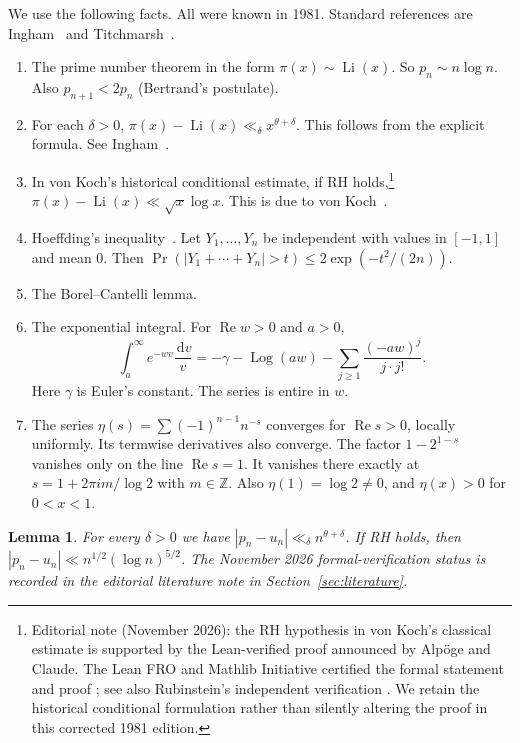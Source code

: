\documentclass[12pt,letterpaper]{article}
\newtheorem{lemma}[theorem]{Lemma}
\theoremstyle{definition}
\theoremstyle{remark}
\numberwithin{equation}{section}
\newcommand{\Li}{\operatorname{Li}}
\newcommand{\Log}{\operatorname{Log}}
\newcommand{\Ree}{\operatorname{Re}}
\newcommand{\dd}{\,\mathrm{d}}
\begin{document}
We use the following facts. All were known in 1981. Standard references
are Ingham~\cite{In32} and Titchmarsh~\cite{Ti51}.
\begin{enumerate}[label=(C\arabic*),leftmargin=3em]
\item\label{C:pnt} The prime number theorem in the form
  $\pi(x)\sim\Li(x)$. So $p_n\sim n\log n$. Also $p_{n+1}<2p_n$
  (Bertrand's postulate).
\item\label{C:ingham} For each $\delta>0$,
  $\pi(x)-\Li(x)\ll_\delta x^{\theta+\delta}$. This follows from the
  explicit formula. See Ingham~\cite{In32}.
\item\label{C:koch} In von Koch's historical conditional estimate, if RH holds,\footnote{Editorial note (November 2026): the RH hypothesis in
von Koch's classical estimate is supported by the Lean-verified proof
announced by Alp\"oge and Claude. The Lean FRO and Mathlib Initiative
certified the formal statement and proof \cite{LF26}; see also
Rubinstein's independent verification \cite{Ru26}. We retain the
historical conditional formulation rather than silently altering
the proof in this corrected 1981 edition.}
  $\pi(x)-\Li(x)\ll\sqrt{x}\log x$. This is due to von
  Koch~\cite{vK01}.
\item\label{C:hoeffding} Hoeffding's inequality~\cite{Ho63}. Let
  $Y_1,\dots,Y_n$ be independent with values in $[-1,1]$ and mean $0$.
  Then $\Pr(|Y_1+\cdots+Y_n|>t)\le 2\exp(-t^2/(2n))$.
\item\label{C:BC} The Borel--Cantelli lemma.
\item\label{C:E1} The exponential integral. For $\Ree w>0$ and $a>0$,
  \[
  \int_a^\infty e^{-wv}\frac{\dd v}{v}
  =-\gamma-\Log(aw)-\sum_{j\ge1}\frac{(-aw)^j}{j\cdot j!}.
  \]
  Here $\gamma$ is Euler's constant. The series is entire in $w$.
\item\label{C:eta} The series $\eta(s)=\sum(-1)^{n-1}n^{-s}$ converges
  for $\Ree s>0$, locally uniformly. Its termwise derivatives also
  converge. The factor $1-2^{1-s}$ vanishes only on the line $\Ree s=1$.
  It vanishes there exactly at $s=1+2\pi i m/\log2$ with $m\in\mathbb Z$.
  Also $\eta(1)=\log 2\ne0$, and $\eta(x)>0$ for $0<x<1$.
\end{enumerate}

\begin{lemma}\label{lem:pnun}
For every $\delta>0$ we have $|p_n-u_n|\ll_\delta n^{\theta+\delta}$. If
RH holds, then $|p_n-u_n|\ll n^{1/2}(\log n)^{5/2}$.
The November 2026 formal-verification status is recorded in the
editorial literature note in Section~\ref{sec:literature}.
\end{lemma}
\end{document}
